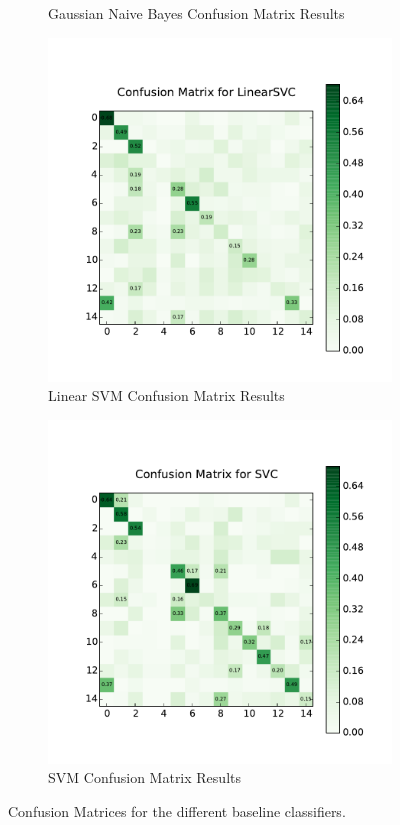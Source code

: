 \begin{figure}[H]
\begin{subfigure}[b]{0.45\linewidth}
		\caption{Gaussian Naive Bayes Confusion Matrix Results}
	\end{subfigure}
	\hfill
	\begin{subfigure}[b]{0.45\linewidth}
		\centering
		\includegraphics[width=\linewidth]{images/baseline/cm_linear_svm.pdf}
		\caption{Linear SVM Confusion Matrix Results}
	\end{subfigure}
	\hfill
	\begin{subfigure}[b]{0.45\linewidth}
		\centering
		\includegraphics[width=\linewidth]{images/baseline/cm_svm.pdf}
		\caption{SVM Confusion Matrix Results}
	\end{subfigure}
	\caption{Confusion Matrices for the different baseline classifiers.}
	\label{baselines}
\end{figure}
